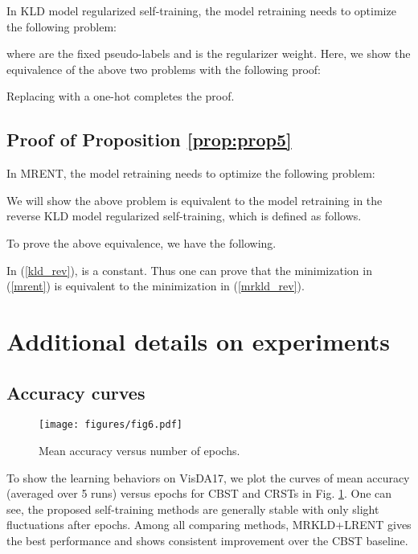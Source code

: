 \documentclass[10pt,twocolumn,letterpaper]{article}
\theoremstyle{plain}
\begin{document}
In KLD model regularized self-training, the model retraining needs to optimize the following problem:

where  are the fixed pseudo-labels and  is the regularizer weight. Here, we show the equivalence of the above two problems with the following proof:

Replacing  with a one-hot completes the proof.

\subsection{Proof of Proposition \ref{prop:prop5}}\label{sec:proofprop5}
In MRENT, the model retraining needs to optimize the following problem:

	
\noindent We will show the above problem is equivalent to the model retraining in the reverse KLD model regularized self-training, which is defined as follows.

To prove the above equivalence, we have the following. 

In (\ref{kld_rev}),  is a constant. Thus one can prove that the minimization in (\ref{mrent}) is equivalent to the minimization in (\ref{mrkld_rev}).


\section{Additional details on experiments}\label{sec:addexp}
\subsection{Accuracy curves}
\begin{figure}[!b]
	\centering
	\texttt{[image: figures/fig6.pdf]}
	\caption{Mean accuracy versus number of epochs.}
	\label{learning_curves}
\end{figure}

To show the learning behaviors on VisDA17, we plot the curves of mean accuracy (averaged over 5 runs) versus epochs for CBST and CRSTs in Fig. \ref{learning_curves}. One can see, the proposed self-training methods are generally stable with only slight fluctuations after  epochs. Among all comparing methods, MRKLD+LRENT gives the best performance and shows consistent improvement over the CBST baseline.
\end{document}
